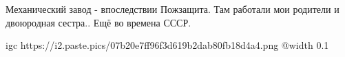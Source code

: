 
 
 
 
 

\qqSecCmt


Механический завод - впоследствии Пожзащита. Там работали мои родители и
двоюродная сестра.. Ещё во времена СССР.


\ifcmt
  igc https://i2.paste.pics/07b20e7ff96f3d619b2dab80fb18d4a4.png
	@width 0.1
\fi

